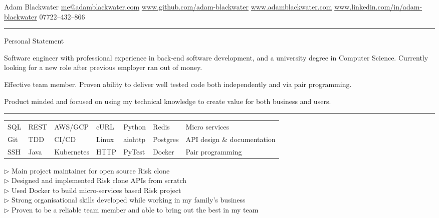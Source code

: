 \documentclass[12pt,twoside]{article}
\begin{document}
\topheading
    {Adam Blackwater}
    {\url{me@adamblackwater.com} \hspace{0.15em}}
    {\url{www.github.com/adam-blackwater}}
    {\url{www.adamblackwater.com}}
    {\url{www.linkedin.com/in/adam-blackwater}}
    {07722--432--866}

\vspace{0.5em}
\hrule
\vspace{0.5em}

\statement
    {Personal Statement}
    {
        Software engineer with professional experience in back-end software
        development, and a university degree in Computer Science. Currently
        looking for a new role after previous employer ran out of money.

        \hspace{1.5em}Effective team member. Proven ability to deliver well
        tested code both independently and via pair programming. 

        \hspace{1.5em}Product minded and focused on using my technical knowledge 
        to create value for both business and users.
    }

\vspace{0.5em}
\hrule
\vspace{0.5em}

\begin{center}
    \begin{tabular}{l l l l l l l}
        SQL & REST & AWS/GCP & cURL & Python & Redis & Micro services \\
        Git & TDD & CI/CD & Linux & aiohttp & Postgres & API design \& documentation \\
        SSH & Java & Kubernetes & HTTP & PyTest& Docker & Pair programming
    \end{tabular}
\end{center}
    
\parbox{35em}{
    $\triangleright$ Main project maintainer for open source Risk clone \\
    $\triangleright$ Designed and implemented Risk clone APIs from scratch \\
    $\triangleright$ Used Docker to build micro-services based Risk project \\
    $\triangleright$ Strong organisational skills developed while working in my family's business \\
    $\triangleright$ Proven to be a reliable team member and able to bring out the best in my team
    }
\end{document}
